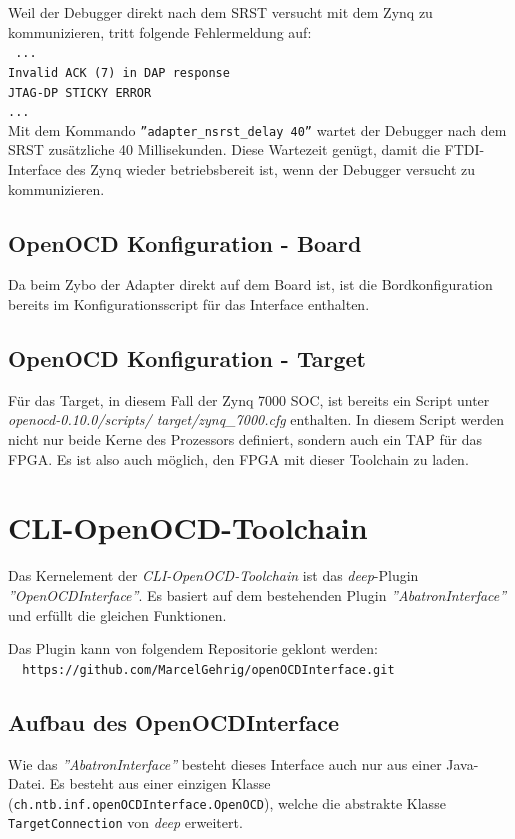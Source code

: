 Weil der Debugger direkt nach dem SRST versucht mit dem Zynq zu kommunizieren, tritt folgende Fehlermeldung auf:\\
\texttt{
...\\
Invalid ACK (7) in DAP response\\
JTAG-DP STICKY ERROR\\
...\\
}
Mit dem Kommando \texttt{''adapter\_nsrst\_delay 40''} wartet der Debugger nach dem SRST zusätzliche 40 Millisekunden.
Diese Wartezeit genügt, damit die FTDI-Interface des Zynq wieder betriebsbereit ist, wenn der Debugger versucht zu kommunizieren.



\subsection{OpenOCD Konfiguration - Board}
Da beim Zybo der Adapter direkt auf dem Board ist, ist die Bordkonfiguration bereits im Konfigurationsscript für das Interface enthalten.

\subsection{OpenOCD Konfiguration - Target}
Für das Target, in diesem Fall der Zynq 7000 SOC, ist bereits ein Script unter \textit{openocd-0.10.0/scripts/ target/zynq\_7000.cfg} enthalten.
In diesem Script werden nicht nur beide Kerne des Prozessors definiert, sondern auch ein TAP für das FPGA.
Es ist also auch möglich, den FPGA mit dieser Toolchain zu laden.


\section{CLI-OpenOCD-Toolchain}
\label{section:CLI-OpenOCD-Toolchain}
Das Kernelement der \textit{CLI-OpenOCD-Toolchain} ist das \textit{deep}-Plugin \textit{''OpenOCDInterface''}.
Es basiert auf dem bestehenden Plugin \textit{''AbatronInterface''} und erfüllt die gleichen Funktionen.

Das Plugin kann von folgendem Repositorie geklont werden:\\
\texttt{\ \ https://github.com/MarcelGehrig/openOCDInterface.git}


\subsection{Aufbau des OpenOCDInterface}
Wie das \textit{''AbatronInterface''} besteht dieses Interface auch nur aus einer Java-Datei.
Es besteht aus einer einzigen Klasse (\texttt{ch.ntb.inf.openOCDInterface.OpenOCD}), welche die abstrakte Klasse\\
	 \texttt{TargetConnection} von \textit{deep} erweitert.

